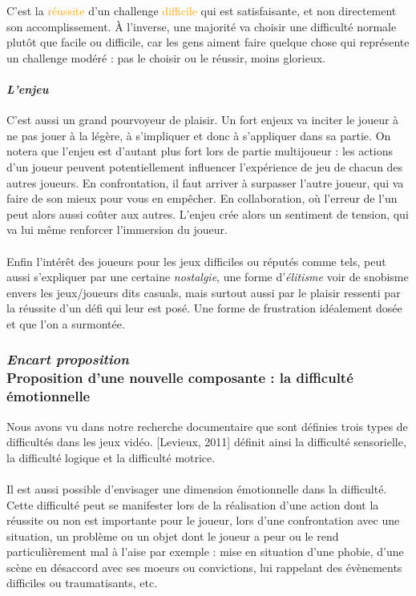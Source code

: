 C'est la \textcolor{orange}{réussite} d'un challenge \textcolor{orange}{difficile} qui est satisfaisante, et non directement son accomplissement. À l'inverse, une majorité va choisir une difficulté normale plutôt que facile ou difficile, car les gens aiment \textcolor{vert}{faire} quelque chose qui représente un \textcolor{vert}{challenge modéré} : pas le choisir ou le réussir, moins glorieux.

			\paragraph{\emph{L’enjeu} \\ \quad}
C’est aussi un grand pourvoyeur de plaisir. Un fort enjeux va inciter le joueur à ne pas jouer à la légère, à s’impliquer et donc à s’appliquer dans sa partie. On notera que l’enjeu est d’autant plus fort lors de partie multijoueur : les actions d’un joueur peuvent potentiellement influencer l’expérience de jeu de chacun des autres joueurs. En confrontation, il faut arriver à surpasser l’autre joueur, qui va faire de son mieux pour vous en empêcher. En collaboration, où l’erreur de l’un peut alors aussi coûter aux autres. L’enjeu crée alors un sentiment de tension, qui va lui même renforcer l’immersion du joueur.

\paragraph{}Enfin l’intérêt des joueurs pour les jeux difficiles ou réputés comme tels, peut aussi s’expliquer par une certaine \emph{nostalgie}, une forme d’\emph{élitisme} voir de snobisme envers les jeux/joueurs dits casuals, mais surtout aussi par le plaisir ressenti par la réussite d’un défi qui leur est posé. Une forme de frustration idéalement dosée et que l’on a surmontée.

\newpage
		
\subsubsection{\emph{Encart proposition \\} Proposition d'une nouvelle composante : la difficulté émotionnelle}
Nous avons vu dans notre recherche documentaire que sont définies trois types de difficultés dans les jeux vidéo. [Levieux, 2011]\cite{Levi11} définit ainsi la difficulté sensorielle, la difficulté logique et la difficulté motrice.

\paragraph{}Il est aussi possible d’envisager une dimension émotionnelle dans la difficulté. Cette difficulté peut se manifester lors de la réalisation d’une action dont la réussite ou non est importante pour le joueur, lors d’une confrontation avec une situation, un problème ou un objet dont le joueur a peur ou le rend particulièrement mal à l’aise par exemple : mise en situation d’une phobie, d’une scène en désaccord avec ses moeurs ou convictions, lui rappelant des évènements difficiles ou traumatisants, etc.
